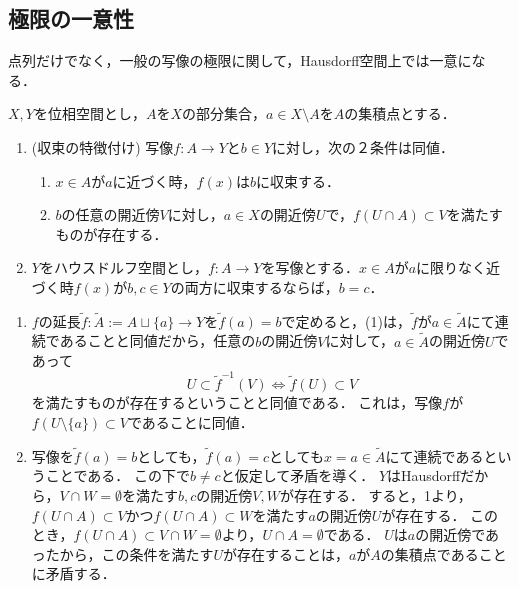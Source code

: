 \documentclass[uplatex,dvipdfmx]{jsreport}
\begin{document}
\subsection{極限の一意性}

\begin{tcolorbox}[colframe=ForestGreen, colback=ForestGreen!10!white,breakable,colbacktitle=ForestGreen!40!white,coltitle=black,fonttitle=\bfseries\sffamily,
title=]
    点列だけでなく，一般の写像の極限に関して，Hausdorff空間上では一意になる．
\end{tcolorbox}

\begin{proposition}[Hausdorff空間では極限は一意的]\label{prop-uniqueness-of-limit-in-Hausdorff-space}
    $X,Y$を位相空間とし，$A$を$X$の部分集合，$a\in X\setminus A$を$A$の集積点とする．
    \begin{enumerate}
        \item (収束の特徴付け) 写像$f:A\to Y$と$b\in Y$に対し，次の２条件は同値．
        \begin{enumerate}[(1)]
            \item $x\in A$が$a$に近づく時，$f(x)$は$b$に収束する．
            \item $b$の任意の開近傍$V$に対し，$a\in X$の開近傍$U$で，$f(U\cap A)\subset V$を満たすものが存在する．
        \end{enumerate}
        \item $Y$をハウスドルフ空間とし，$f:A\to Y$を写像とする．$x\in A$が$a$に限りなく近づく時$f(x)$が$b,c\in Y$の両方に収束するならば，$b=c$．
    \end{enumerate}
\end{proposition}
\begin{Proof}\mbox{}
    \begin{enumerate}
        \item $f$の延長$\widetilde{f}:\widetilde{A}:=A\sqcup\{a\}\to Y$を$\widetilde{f}(a)=b$で定めると，(1)は，$\widetilde{f}$が$a\in\widetilde{A}$にて連続であることと同値だから，任意の$b$の開近傍$V$に対して，$a\in\widetilde{A}$の開近傍$U$であって
        \[U\subset\widetilde{f}^{-1}(V)\Leftrightarrow \widetilde{f}(U)\subset V\]
        を満たすものが存在するということと同値である．
        これは，写像$f$が$f(U\setminus\{a\})\subset V$であることに同値．
        \item 
        写像を$\widetilde{f}(a)=b$としても，$\widetilde{f}(a)=c$としても$x=a\in\widetilde{A}$にて連続であるということである．
        この下で$b\ne c$と仮定して矛盾を導く．
        $Y$はHausdorffだから，$V\cap W=\emptyset$を満たす$b,c$の開近傍$V,W$が存在する．
        すると，1より，$f(U\cap A)\subset V$かつ$f(U\cap A)\subset W$を満たす$a$の開近傍$U$が存在する．
        このとき，$f(U\cap A)\subset V\cap W=\emptyset$より，$U\cap A=\emptyset$である．
        $U$は$a$の開近傍であったから，この条件を満たす$U$が存在することは，$a$が$A$の集積点であることに矛盾する．
    \end{enumerate}
\end{Proof}
\end{document}
